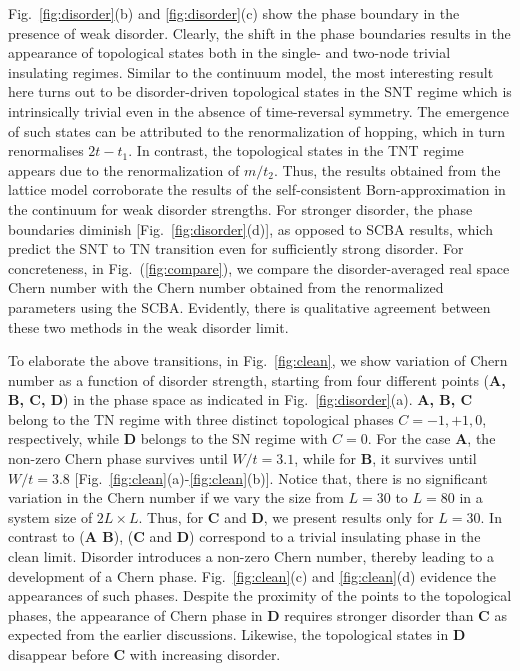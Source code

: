 \documentclass[aps,prb,showpacs,twocolumn,floats]{revtex4-1}
\begin{document}
Fig.~\ref{fig:disorder}(b) and \ref{fig:disorder}(c) show the phase boundary in the presence of weak disorder. Clearly, the shift in the phase boundaries results in the appearance of topological states  both in the single- and two-node trivial insulating regimes. Similar to the continuum model, the most interesting result here turns out to be disorder-driven topological states in the SNT regime which is intrinsically trivial even in the absence of time-reversal symmetry. The emergence of such states can be attributed to the renormalization of hopping, which in turn renormalises $2t-t_1$. In contrast, the topological states in the TNT regime appears due to the renormalization of $m/t_2$. Thus, the results obtained from the lattice model corroborate the results of the self-consistent Born-approximation in the continuum for weak disorder strengths. For stronger disorder, the phase boundaries diminish [Fig.~\ref{fig:disorder}(d)], as opposed to SCBA results, which predict the SNT to TN transition even for sufficiently strong disorder. For concreteness, in Fig.~(\ref{fig:compare}), we compare the disorder-averaged real space Chern number with the Chern number obtained from the renormalized  parameters using the SCBA. Evidently, there is qualitative agreement between these two methods in the weak disorder limit.

To elaborate the above transitions, in Fig.~\ref{fig:clean}, we show variation of Chern number as a function of disorder strength, starting from four different points ({\bf A, B, C, D}) in the phase space as indicated in Fig.~\ref{fig:disorder}(a). {\bf A, B, C} belong to the TN regime with three distinct topological phases $C=-1,+1,0$, respectively, while {\bf D} belongs to the SN regime with $C=0$. For the case {\bf A}, the non-zero Chern phase survives until $W/t=3.1$, while for {\bf B}, it survives until $W/t = 3.8$ [Fig.~\ref{fig:clean}(a)-\ref{fig:clean}(b)]. Notice that, there is no significant variation in the Chern number if we vary the size from $L = 30$ to $L = 80$ in a system size of $2L\times L$. Thus, for {\bf C} and {\bf D}, we present results only for   $L=30$. In contrast to ({\bf A  B}),   ({\bf C} and {\bf D}) correspond to a trivial insulating phase in the clean limit. Disorder introduces a non-zero Chern number, thereby leading to a development of a Chern phase. Fig.~\ref{fig:clean}(c) and \ref{fig:clean}(d) evidence the appearances of such phases. Despite the proximity of the points to the topological phases, the appearance of Chern phase in {\bf D} requires stronger disorder than {\bf C} as expected from the earlier discussions. Likewise, the topological states in {\bf D} disappear before {\bf C} with increasing disorder. 
\end{document}
